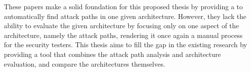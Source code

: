 These papers make a solid foundation for this proposed thesis by providing a to automatically find attack paths in one given architecture.
However, they lack the ability to evaluate the given architecture by focusing only on one aspect of the architecture, namely the attack paths, rendering it once again a manual process for the security testers.
This thesis aims to fill the gap in the existing research by providing a tool that combines the attack path analysis 
and architecture evaluation, and compare the architectures themselves.
